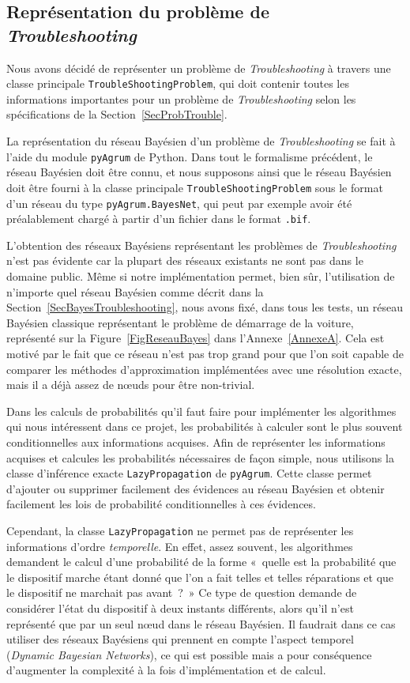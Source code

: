 \documentclass[a4paper,11pt]{article}
\theoremstyle{plain}
\theoremstyle{definition}
\begin{document}
\subsection{Représentation du problème de \emph{Troubleshooting}}
\label{SecImplRepresentation}

Nous avons décidé de représenter un problème de \emph{Troubleshooting} à travers une classe principale \texttt{TroubleShootingProblem}, qui doit contenir toutes les informations importantes pour un problème de \emph{Troubleshooting} selon les spécifications de la Section~\ref{SecProbTrouble}.

La représentation du réseau Bayésien d'un problème de \emph{Troubleshooting} se fait à l'aide du module \texttt{pyAgrum} de Python. Dans tout le formalisme précédent, le réseau Bayésien doit être connu, et nous supposons ainsi que le réseau Bayésien doit être fourni à la classe principale \texttt{TroubleShootingProblem} sous le format d'un réseau du type \texttt{pyAgrum.BayesNet}, qui peut par exemple avoir été préalablement chargé à partir d'un fichier dans le format \texttt{.bif}.

L'obtention des réseaux Bayésiens représentant les problèmes de \emph{Troubleshooting} n'est pas évidente car la plupart des réseaux existants ne sont pas dans le domaine public. Même si notre implémentation permet, bien sûr, l'utilisation de n'importe quel réseau Bayésien comme décrit dans la Section~\ref{SecBayesTroubleshooting}, nous avons fixé, dans tous les tests, un réseau Bayésien classique représentant le problème de démarrage de la voiture, représenté sur la Figure~\ref{FigReseauBayes} dans l'Annexe~\ref{AnnexeA}. Cela est motivé par le fait que ce réseau n'est pas trop grand pour que l'on soit capable de comparer les méthodes d'approximation implémentées avec une résolution exacte, mais il a déjà assez de nœuds pour être non-trivial.

Dans les calculs de probabilités qu'il faut faire pour implémenter les algorithmes qui nous intéressent dans ce projet, les probabilités à calculer sont le plus souvent conditionnelles aux informations acquises. Afin de représenter les informations acquises et calcules les probabilités nécessaires de façon simple, nous utilisons la classe d'inférence exacte \texttt{LazyPropagation} de \texttt{pyAgrum}. Cette classe permet d'ajouter ou supprimer facilement des évidences au réseau Bayésien et obtenir facilement les lois de probabilité conditionnelles à ces évidences.

Cependant, la classe \texttt{LazyPropagation} ne permet pas de représenter les informations d'ordre \emph{temporelle}. En effet, assez souvent, les algorithmes demandent le calcul d'une probabilité de la forme «~quelle est la probabilité que le dispositif marche étant donné que l'on a fait telles et telles réparations et que le dispositif ne marchait pas avant~?~» Ce type de question demande de considérer l'état du dispositif à deux instants différents, alors qu'il n'est représenté que par un seul nœud dans le réseau Bayésien. Il faudrait dans ce cas utiliser des réseaux Bayésiens qui prennent en compte l'aspect temporel (\emph{Dynamic Bayesian Networks}), ce qui est possible mais a pour conséquence d'augmenter la complexité à la fois d'implémentation et de calcul.
\end{document}
